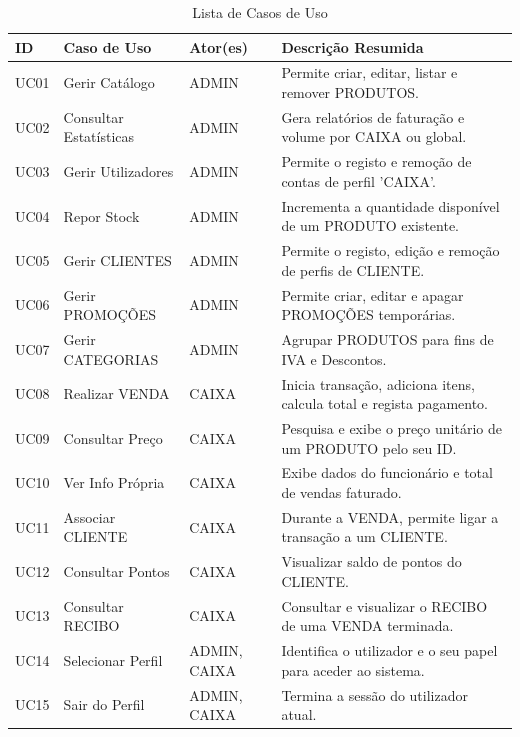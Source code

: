 \documentclass[a4paper]{llncs}
\begin{document}
\begin{table}[H]
    \centering
    \footnotesize
    \setlength{\tabcolsep}{4pt}
    \begin{tabularx}{\textwidth}{lllX}
        \toprule
        \textbf{ID} & \textbf{Caso de Uso} & \textbf{Ator(es)} & \textbf{Descrição Resumida} \\ \midrule
        UC01 & Gerir Catálogo & ADMIN & Permite criar, editar, listar e remover PRODUTOS. \\
        UC02 & Consultar Estatísticas & ADMIN & Gera relatórios de faturação e volume por CAIXA ou global. \\
        UC03 & Gerir Utilizadores & ADMIN & Permite o registo e remoção de contas de perfil 'CAIXA'. \\
        UC04 & Repor Stock & ADMIN & Incrementa a quantidade disponível de um PRODUTO existente. \\
        UC05 & Gerir CLIENTES & ADMIN & Permite o registo, edição e remoção de perfis de CLIENTE. \\
        UC06 & Gerir PROMOÇÕES & ADMIN & Permite criar, editar e apagar PROMOÇÕES temporárias. \\
        UC07 & Gerir CATEGORIAS & ADMIN & Agrupar PRODUTOS para fins de IVA e Descontos. \\
        UC08 & Realizar VENDA & CAIXA & Inicia transação, adiciona itens, calcula total e regista pagamento. \\
        UC09 & Consultar Preço & CAIXA & Pesquisa e exibe o preço unitário de um PRODUTO pelo seu ID. \\
        UC10 & Ver Info Própria & CAIXA & Exibe dados do funcionário e total de vendas faturado. \\
        UC11 & Associar CLIENTE & CAIXA & Durante a VENDA, permite ligar a transação a um CLIENTE. \\
        UC12 & Consultar Pontos & CAIXA & Visualizar saldo de pontos do CLIENTE. \\
        UC13 & Consultar RECIBO & CAIXA & Consultar e visualizar o RECIBO de uma VENDA terminada. \\
        UC14 & Selecionar Perfil & ADMIN, CAIXA & Identifica o utilizador e o seu papel para aceder ao sistema. \\
        UC15 & Sair do Perfil & ADMIN, CAIXA & Termina a sessão do utilizador atual. \\ \bottomrule
    \end{tabularx}
    \caption{Lista de Casos de Uso}
    \label{tab:use_cases}
\end{table}
\end{document}
